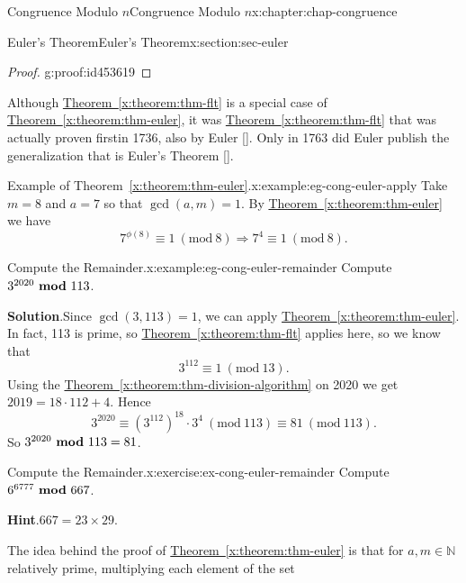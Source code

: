 \documentclass[oneside,10pt,]{book}
\newcommand{\blocktitlefont}{\relax}
\newcommand{\xreffont}{\relax}
\numberwithin{equation}{section}
\newcommand{\Mod}[1]{\ \left(\mathrm{mod}\ #1\right)}
\newcommand{\mmod}[1]{\ \mathrm{\bf mod}\ #1}
\begin{document}
\begin{chapterptx}{Congruence Modulo \(n\)}{}{Congruence Modulo \(n\)}{}{}{x:chapter:chap-congruence}
\begin{sectionptx}{Euler's Theorem}{}{Euler's Theorem}{}{}{x:section:sec-euler}
\begin{proof}{}{g:proof:id453619}
\end{proof}
Although \hyperref[x:theorem:thm-flt]{Theorem~{\xreffont\ref{x:theorem:thm-flt}}} is a special case of \hyperref[x:theorem:thm-euler]{Theorem~{\xreffont\ref{x:theorem:thm-euler}}}, it was \hyperref[x:theorem:thm-flt]{Theorem~{\xreffont\ref{x:theorem:thm-flt}}} that was actually proven first\textemdash{}in 1736, also by Euler \hyperlink{x:biblio:bib-euler-54}{[{\xreffont 1}]}. Only in 1763 did Euler publish the generalization that is Euler's Theorem \hyperlink{x:biblio:bib-euler-271}{[{\xreffont 2}]}.%
\begin{example}{Example of Theorem~{\xreffont\ref*{x:theorem:thm-euler}}.}{x:example:eg-cong-euler-apply}%
Take \(m = 8\) and \(a = 7\) so that \(\gcd(a,m) = 1\). By \hyperref[x:theorem:thm-euler]{Theorem~{\xreffont\ref{x:theorem:thm-euler}}} we have%
\begin{equation*}
7^{\phi(8)} \equiv 1 \Mod{8} \Rightarrow 7^4 \equiv 1 \Mod{8}\text{.}
\end{equation*}
%
\end{example}
\begin{example}{Compute the Remainder.}{x:example:eg-cong-euler-remainder}%
Compute \(3^{2020} \mmod 113\).%
\par\smallskip%
\noindent\textbf{\blocktitlefont Solution}.\hypertarget{g:solution:id453693}{}\quad{}Since \(\gcd(3,113) = 1\), we can apply \hyperref[x:theorem:thm-euler]{Theorem~{\xreffont\ref{x:theorem:thm-euler}}}. In fact, 113 is prime, so \hyperref[x:theorem:thm-flt]{Theorem~{\xreffont\ref{x:theorem:thm-flt}}} applies here, so we know that%
\begin{equation*}
3^{112} \equiv 1 \Mod{13}\text{.}
\end{equation*}
Using the \hyperref[x:theorem:thm-division-algorithm]{Theorem~{\xreffont\ref{x:theorem:thm-division-algorithm}}} on 2020 we get \(2019 = 18\cdot 112 + 4\). Hence%
\begin{equation*}
3^{2020} \equiv (3^{112})^{18} \cdot 3^4 \Mod{113} \equiv 81 \Mod{113}\text{.}
\end{equation*}
So \(3^{2020} \mmod 113 = 81\).%
\end{example}
\begin{inlineexercise}{Compute the Remainder.}{x:exercise:ex-cong-euler-remainder}%
Compute \(6^{6777} \mmod 667\).%
\par\smallskip%
\noindent\textbf{\blocktitlefont Hint}.\hypertarget{g:hint:id453714}{}\quad{}\(667 = 23 \times 29.\)%
\end{inlineexercise}
The idea behind the proof of \hyperref[x:theorem:thm-euler]{Theorem~{\xreffont\ref{x:theorem:thm-euler}}} is that for \(a,m \in \mathbb{N}\) relatively prime, multiplying each element of the set%

\end{sectionptx}
\end{chapterptx}
\end{document}

